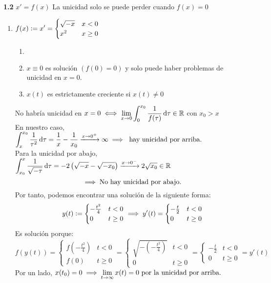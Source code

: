 \textbf{1.2} $x'=f(x)$ La unicidad solo se puede perder cuando $f(x)=0$
\begin{enumerate}
	\item $\displaystyle f(x)\vcentcolon= x'=\begin{cases}
		\sqrt{-x} & x<0 \\
		x^2 & x\geq 0
	\end{cases}$
	\begin{obs}\begin{enumerate}
		\item[]
		\item $x\equiv 0$ es solución $\left(f(0)=0\right)$ y solo puede haber problemas de unicidad en $x=0$.
		\item $x(t)$ es estrictamente creciente si $x(t)\ne 0$
	\end{enumerate}\end{obs}
	No habría unicidad en $\ds x=0 \iff \lim_{x\to 0} \int_{0}^{x_0} \frac{1}{f(\tau)} \odif{\tau} \in \R$ con $x_0>x$ \\
	En nuestro caso, $\ds \int_{x}^{x_0} \frac{1}{\tau^2} \odif{\tau} = \frac{1}{x} - \frac{1}{x_0} \xrightarrow{x\to 0^+} \infty \implies \tex{ hay unicidad por arriba.}$ \\
	Para la unicidad por abajo, $\ds \int_{x_0}^{x} \frac{1}{\sqrt{-\tau}} \odif{\tau} = -2\left(\sqrt{-x} - \sqrt{-x_0}\right) \xrightarrow{x\to 0^-} 2 \sqrt{x_0} \in \R$
	\[\implies \text{No hay unicidad por abajo.}\]
	Por tanto, podemos encontrar una solución de la siguiente forma:
	\[y(t)\vcentcolon= \begin{cases}
		-\frac{t^2}{4} & t<0 \\
		0 & t\geq 0
	\end{cases} \implies y'(t)=\begin{cases}
		-\frac{t}{2} & t<0 \\
		0 & t\geq 0
	\end{cases}\]
	Es solución porque:
	\[f(y(t))=\begin{cases}
		f(-\frac{t^2}{4}) & t<0 \\
		f(0) & t\geq 0
	\end{cases} = \begin{cases}
		\sqrt{-\left(-\frac{t^2}{4}\right)} & t<0 \\
		0 & t\geq 0
	\end{cases} = \begin{cases}
		-\frac{t}{2} & t<0 \\
		0 & t\geq 0
	\end{cases} = y'(t)\]
	Por un lado, $\displaystyle x(t_0)=0 \implies \lim_{t\to \infty}x(t)=0 \text{ por la unicidad por arriba.}$ \\

\end{enumerate}
